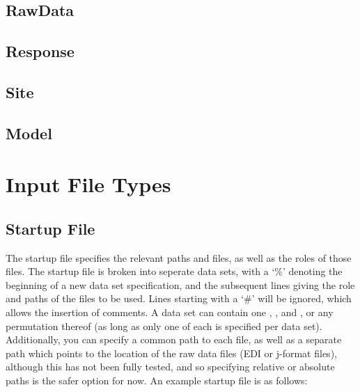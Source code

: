 \documentclass[letterpaper,10pt,english]{sphinxmanual}
\begin{document}
\subsection{RawData}
\label{\detokenize{content/api_core/data_structures:rawdata}}\label{\detokenize{content/api_core/data_structures:id4}}

\subsection{Response}
\label{\detokenize{content/api_core/data_structures:response}}\label{\detokenize{content/api_core/data_structures:id5}}

\subsection{Site}
\label{\detokenize{content/api_core/data_structures:site}}\label{\detokenize{content/api_core/data_structures:id6}}

\subsection{Model}
\label{\detokenize{content/api_core/data_structures:model}}\label{\detokenize{content/api_core/data_structures:id7}}

\section{Input File Types}
\label{\detokenize{content/api_core/input_files:input-file-types}}\label{\detokenize{content/api_core/input_files::doc}}

\subsection{Startup File}
\label{\detokenize{content/api_core/input_files:startup-file}}\label{\detokenize{content/api_core/input_files:id1}}
The startup file specifies the relevant paths and files, as well as the roles of those files.
The startup file is broken into seperate data sets, with a ‘\%’ denoting the beginning of a new data set specification, and the subsequent lines giving the role and paths of the files to be used. Lines starting with a ‘\#’ will be ignored, which allows the insertion of comments.
A data set can contain one {\hyperref[\detokenize{content/api_core/input_files:list-file}]{}}, {\hyperref[\detokenize{content/api_core/input_files:data-file}]{}}, and {\hyperref[\detokenize{content/api_core/input_files:response-file}]{}}, or any permutation thereof (as long as only one of each is specified per data set). Additionally, you can specify a common path to each file, as well as a separate path which points to the location of the raw data files (EDI or j-format files), although this has not been fully tested, and so specifying relative or absolute paths is the safer option for now.
An example startup file is as follows:
\end{document}
